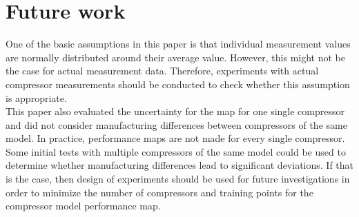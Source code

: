 \section{Future work}
\label{sec:future_work}
One of the basic assumptions in this paper is that individual measurement values are normally distributed around their average value. However, this might not be the case for actual measurement data. Therefore, experiments with actual compressor measurements should be conducted to check whether this assumption is appropriate.\\
This paper also evaluated the uncertainty for the map for one single compressor and did not consider manufacturing differences between compressors of the same model. In practice, performance maps are not made for every single compressor.  Some initial tests with multiple compressors of the same model could be used to determine whether manufacturing differences lead to significant deviations. If that is the case, then design of experiments should be used for future investigations in order to minimize the number of compressors and training points for the compressor model performance map.